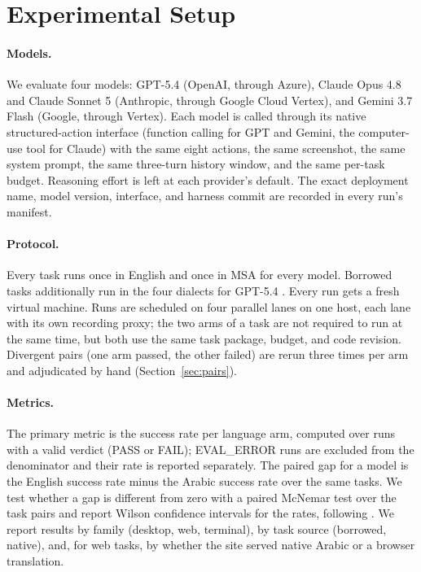 \section{Experimental Setup}
\label{sec:setup}

\paragraph{Models.}
We evaluate four models: GPT-5.4 (OpenAI, through Azure), Claude Opus 4.8 and
Claude Sonnet 5 (Anthropic, through Google Cloud Vertex), and Gemini 3.7 Flash
(Google, through Vertex).  Each model
is called through its native structured-action interface (function calling for
GPT and Gemini, the computer-use tool for Claude) with the same eight actions,
the same screenshot, the same system prompt, the same three-turn history
window, and the same per-task budget. Reasoning effort is left at each
provider's default. The exact deployment name, model version, interface, and
harness commit are recorded in every run's manifest.

\paragraph{Protocol.}
Every task runs once in English and once in MSA for every model. Borrowed
tasks additionally run in the four dialects for GPT-5.4
.
Every run gets a fresh virtual machine. Runs are scheduled on four parallel
lanes on one host, each lane with its own recording proxy; the two arms of a
task are not required to run at the same time, but both use the same task
package, budget, and code revision. Divergent pairs (one arm passed, the other
failed) are rerun three times per arm and adjudicated by hand
(Section~\ref{sec:pairs}).

\paragraph{Metrics.}
The primary metric is the success rate per language arm, computed over runs
with a valid verdict (PASS or FAIL); EVAL\_ERROR runs are excluded from the
denominator and their rate is reported separately. The paired gap for a model
is the English success rate minus the Arabic success rate over the same tasks.
We test whether a gap is different from zero with a paired McNemar test over
the task pairs and report Wilson confidence intervals for the rates, following
\citet{caciolai2026omnilingual}. We report results by family (desktop, web,
terminal), by task source (borrowed, native), and, for web tasks, by whether
the site served native Arabic or a browser translation.

